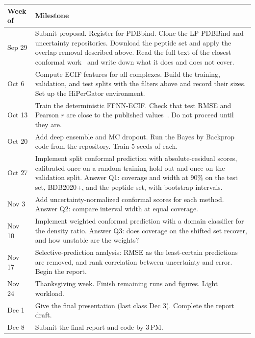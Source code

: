 \documentclass[10pt,twocolumn]{article}
\begin{document}
\begin{center}
\footnotesize
\begin{tabular}{@{}>{\raggedright\arraybackslash}p{1.3cm}>{\raggedright\arraybackslash}p{6.6cm}@{}}
  \toprule
  Week of & Milestone \\
  \midrule
  Sep 29 & Submit proposal. Register for PDBbind. Clone the LP-PDBBind and uncertainty repositories. Download the peptide set and apply the overlap removal described above. Read the full text of the closest conformal work~\cite{parks2020,orsolic2023,codrug2023} and write down what it does and does not cover. \\
  Oct 6  & Compute ECIF features for all complexes. Build the training, validation, and test splits with the filters above and record their sizes. Set up the HiPerGator environment. \\
  Oct 13 & Train the deterministic FFNN-ECIF. Check that test RMSE and Pearson $r$ are close to the published values~\cite{rayka2025}. Do not proceed until they are. \\
  Oct 20 & Add deep ensemble and MC dropout. Run the Bayes by Backprop code from the repository. Train 5 seeds of each. \\
  Oct 27 & Implement split conformal prediction with absolute-residual scores, calibrated once on a random training hold-out and once on the validation split. Answer Q1: coverage and width at 90\% on the test set, BDB2020+, and the peptide set, with bootstrap intervals. \\
  Nov 3  & Add uncertainty-normalized conformal scores for each method. Answer Q2: compare interval width at equal coverage. \\
  Nov 10 & Implement weighted conformal prediction with a domain classifier for the density ratio. Answer Q3: does coverage on the shifted set recover, and how unstable are the weights? \\
  Nov 17 & Selective-prediction analysis: RMSE as the least-certain predictions are removed, and rank correlation between uncertainty and error. Begin the report. \\
  Nov 24 & Thanksgiving week. Finish remaining runs and figures. Light workload. \\
  Dec 1  & Give the final presentation (last class Dec 3). Complete the report draft. \\
  Dec 8  & Submit the final report and code by 3\,PM. \\
  \bottomrule
\end{tabular}
\end{center}
\end{document}

